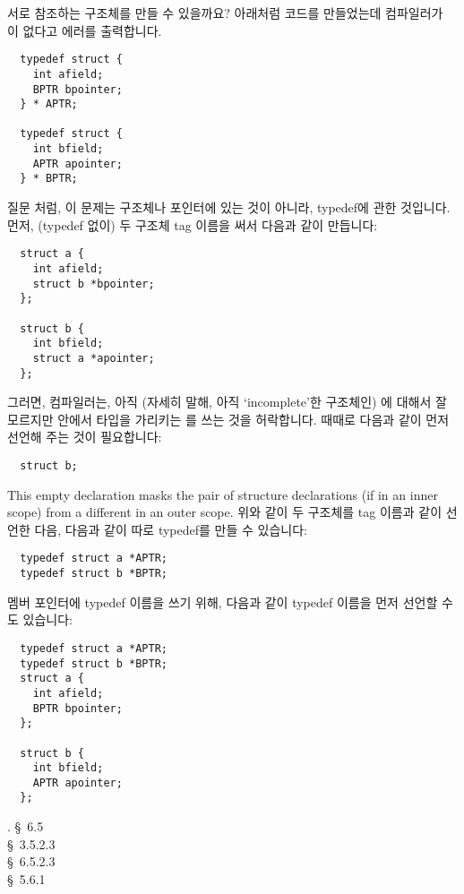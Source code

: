 \begin{faq}
        서로 참조하는 구조체를 만들 수 있을까요? 아래처럼 코드를 
        만들었는데 컴파일러가 이 없다고 에러를 출력합니다.
\begin{verbatim}
  typedef struct {
    int afield;
    BPTR bpointer;
  } * APTR;

  typedef struct {
    int bfield;
    APTR apointer;
  } * BPTR;
\end{verbatim}
\A
        질문 처럼, 이 문제는 구조체나 포인터에 있는 것이 아니라, 
        typedef에 관한 것입니다.
        먼저, (typedef 없이) 두 구조체 tag 이름을 써서 다음과 같이 만듭니다:
\begin{verbatim}
  struct a {
    int afield;
    struct b *bpointer;
  };

  struct b {
    int bfield;
    struct a *apointer;
  };
\end{verbatim}
        그러면, 컴파일러는, 아직 (자세히 말해, 아직 `incomplete'한 구조체인)
        에 대해서 잘 모르지만  안에서 
         타입을 가리키는 를 쓰는 것을
        허락합니다. 때때로 다음과 같이 먼저 선언해 주는 것이 필요합니다:
\begin{verbatim}
  struct b;
\end{verbatim}
        This empty declaration masks the pair of structure declarations
        (if in an inner scope) from a different  in an outer
        scope. 위와 같이 두 구조체를 tag 이름과 같이 선언한 다음, 다음과 
        같이 따로 typedef를 만들 수 있습니다:
\begin{verbatim}
  typedef struct a *APTR;
  typedef struct b *BPTR;
\end{verbatim}
        멤버 포인터에 typedef 이름을 쓰기 위해, 다음과 같이 typedef 이름을 
        먼저 선언할 수도 있습니다:
\begin{verbatim}
  typedef struct a *APTR;
  typedef struct b *BPTR;
  struct a {
    int afield;
    BPTR bpointer;
  };

  struct b {
    int bfield;
    APTR apointer;
  };
\end{verbatim}
        .
\R
        \cite{kr2} \S\ 6.5  \\
        \cite{ansi} \S\ 3.5.2.3 \\
        \cite{c89} \S\ 6.5.2.3 \\
        \cite{hs} \S\ 5.6.1 
\end{faq}

